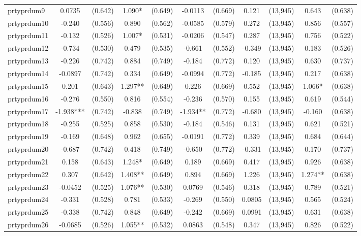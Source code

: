 \documentclass[]{article}
\begin{document}
\begin{tabular}{lcccccccccc}
prtyprdum9 & 0.0735 & (0.642) & 1.090* & (0.649) & -0.0113 & (0.669) & 0.121 & (13,945) & 0.643 & (0.638) \\
prtyprdum10 & -0.240 & (0.556) & 0.890 & (0.562) & -0.0585 & (0.579) & 0.272 & (13,945) & 0.856 & (0.557) \\
prtyprdum11 & -0.132 & (0.526) & 1.007* & (0.531) & -0.0206 & (0.547) & 0.287 & (13,945) & 0.756 & (0.522) \\
prtyprdum12 & -0.734 & (0.530) & 0.479 & (0.535) & -0.661 & (0.552) & -0.349 & (13,945) & 0.183 & (0.526) \\
prtyprdum13 & -0.226 & (0.742) & 0.884 & (0.749) & -0.184 & (0.772) & 0.120 & (13,945) & 0.630 & (0.737) \\
prtyprdum14 & -0.0897 & (0.742) & 0.334 & (0.649) & -0.0994 & (0.772) & -0.185 & (13,945) & 0.217 & (0.638) \\
prtyprdum15 & 0.201 & (0.643) & 1.297** & (0.649) & 0.226 & (0.669) & 0.552 & (13,945) & 1.066* & (0.638) \\
prtyprdum16 & -0.276 & (0.550) & 0.816 & (0.554) & -0.236 & (0.570) & 0.155 & (13,945) & 0.619 & (0.544) \\
prtyprdum17 & -1.938*** & (0.742) & -0.838 & (0.749) & -1.934** & (0.772) & -0.680 & (13,945) & -0.160 & (0.638) \\
prtyprdum18 & -0.255 & (0.525) & 0.858 & (0.530) & -0.184 & (0.546) & 0.131 & (13,945) & 0.621 & (0.521) \\
prtyprdum19 & -0.169 & (0.648) & 0.962 & (0.655) & -0.0191 & (0.772) & 0.339 & (13,945) & 0.684 & (0.644) \\
prtyprdum20 & -0.687 & (0.742) & 0.418 & (0.749) & -0.650 & (0.772) & -0.331 & (13,945) & 0.170 & (0.737) \\
prtyprdum21 & 0.158 & (0.643) & 1.248* & (0.649) & 0.189 & (0.669) & 0.417 & (13,945) & 0.926 & (0.638) \\
prtyprdum22 & 0.307 & (0.642) & 1.408** & (0.649) & 0.894 & (0.669) & 1.226 & (13,945) & 1.274** & (0.638) \\
prtyprdum23 & -0.0452 & (0.525) & 1.076** & (0.530) & 0.0769 & (0.546) & 0.318 & (13,945) & 0.789 & (0.521) \\
prtyprdum24 & -0.331 & (0.528) & 0.781 & (0.533) & -0.269 & (0.550) & 0.0805 & (13,945) & 0.565 & (0.524) \\
prtyprdum25 & -0.338 & (0.742) & 0.848 & (0.649) & -0.242 & (0.669) & 0.0991 & (13,945) & 0.631 & (0.638) \\
prtyprdum26 & -0.0685 & (0.526) & 1.055** & (0.532) & 0.0863 & (0.548) & 0.347 & (13,945) & 0.826 & (0.522) \\

\end{tabular}
\end{document}
